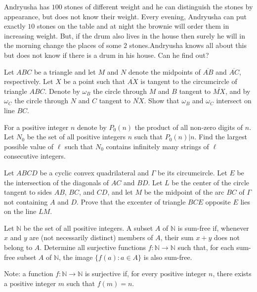 \documentclass[11pt]{scrartcl}
\begin{document}
\begin{problem}[499788610931519]
	Andryusha has $100$ stones of different weight and he can distinguish the stones by appearance, but does not know their weight. Every evening, Andryusha can put exactly $10$ stones on the table and at night the brownie will order them in increasing weight. But, if the drum also lives in the house then surely he will in the morning change the places of some $2$ stones.Andryusha knows all about this but does not know if there is a drum in his house. Can he find out?
\end{problem}
\begin{problem}[503121367540901]
	Let $ABC$ be a triangle and let $M$ and $N$ denote the midpoints of $\overline{AB}$ and $\overline{AC}$, respectively. Let $X$ be a point such that $\overline{AX}$ is tangent to the circumcircle of triangle $ABC$. Denote by $\omega_B$ the circle through $M$ and $B$ tangent to $\overline{MX}$, and by $\omega_C$ the circle through $N$ and $C$ tangent to $\overline{NX}$. Show that $\omega_B$ and $\omega_C$ intersect on line $BC$.
\end{problem}
\begin{problem}[504512181993018]
For a positive integer $n$ denote by $P_0(n)$ the product of all non-zero digits of $n$. Let $N_0$ be the set of all positive integers $n$ such that $P_0(n)|n$. Find the largest possible value of $\ell$ such that $N_0$ contains infinitely many strings of $\ell$ consecutive integers.
\end{problem}
\begin{problem}[512052756136271]
	Let $ABCD$ be a cyclic convex quadrilateral and $\Gamma$ be its circumcircle. Let $E$ be the intersection of the diagonals of $AC$ and $BD$. Let $L$ be the center of the circle tangent to sides $AB$, $BC$, and $CD$, and let $M$ be the midpoint of the arc $BC$ of $\Gamma$ not containing $A$ and $D$. Prove that the excenter of triangle $BCE$ opposite $E$ lies on the line $LM$.
\end{problem}
\begin{problem}[512148051997527]
	Let $\mathbb N$ be the set of all positive integers. A subset $A$ of $\mathbb N$ is sum-free if, whenever $x$ and $y$ are (not necessarily distinct) members of $A$, their sum $x+y$ does not belong to $A$. Determine all surjective functions $f:\mathbb N\to\mathbb N$ such that, for each sum-free subset $A$ of $\mathbb N$, the image $\{f(a):a\in A\}$ is also sum-free.

Note: a function $f:\mathbb N\to\mathbb N$ is surjective if, for every positive integer $n$, there exists a positive integer $m$ such that $f(m)=n$.
\end{problem}
\end{document}
